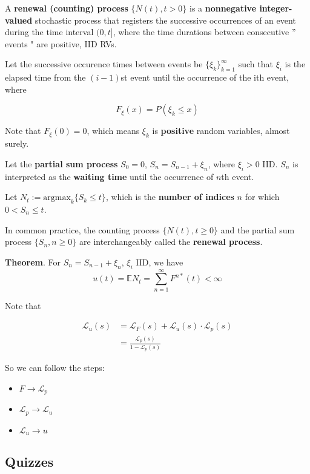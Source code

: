 \documentclass[12pt]{article}
\theoremstyle{nonumberbreak}
\begin{document}
A \textbf{renewal (counting) process} $\{N(t), t > 0\}$ is a \textbf{nonnegative integer-valued} stochastic process that registers the successive occurrences of an event during the time interval $(0, t]$, where the time durations between consecutive '' events " are positive, IID RVs. 

Let the successive occurence times between
events be $\{\xi_k\}_{k=1}^\infty$ such that $\xi_i$ is the elapsed time from the $(i-1)$st event until the occurrence of the ith event, where

$$
F_\xi (x) = P(\xi_k \le x)
$$

Note that $F_\xi(0) = 0$, which means $\xi_k$ is \textbf{positive} random variables, almost surely. 

Let the \textbf{partial sum process} $S_0 = 0$, $S_n = S_{n-1} + \xi_n$, where $\xi_i >0$ IID. $S_n$ is interpreted as the \textbf{waiting time} until the occurrence of $n$th event. 


Let $N_t := \mathrm{argmax}_k \{S_k \le t\}$, which is the \textbf{number of indices} $n$ for which $0 < S_n \le t$. 

In common practice, the counting process $\{N(t), t \ge 0 \}$ and the partial sum process $\{ S_n, n \ge 0 \}$ are interchangeably called the \textbf{renewal process}. 


\begin{theorem}
\textbf{Theorem}. For $S_n = S_{n-1} + \xi_n$, $\xi_i$ IID, we have
$$u(t) = \mathbb{E} N_t = \sum_{n=1}^\infty F^{n\ast} (t) < \infty$$
\end{theorem}


Note that 

$$
\begin{aligned}
\mathcal{L}_u (s) &= \mathcal{L}_F (s) + \mathcal{L}_u (s) \cdot \mathcal{L}_p (s) \\[8pt]
&= \frac{\mathcal{L}_p(s)}{1-\mathcal{L}_p(s)}
\end{aligned}
$$


So we can follow the steps:

\begin{itemize}
	\item $F \to \mathcal{L}_p$
	\item $\mathcal{L}_p \to \mathcal{L}_u$
	\item $\mathcal{L}_u \to u$
\end{itemize}


\subsection*{Quizzes}
\end{document}
